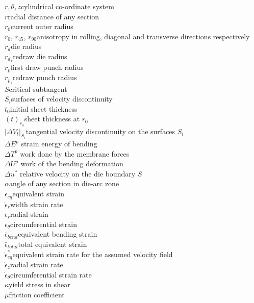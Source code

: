\begin{tabbing}
             \>$r,\theta,z$\>\>\>\>\>cylindrical co-ordinate system \\
             \>$r$\>\>\>\>\>radial distance of any section\\
             \>$r_0$\>\>\>\>\>current outer radius\\
             \>$r_0$, $r_{45}$, $r_{90}$\>\>\>\>\>anisotropy in rolling, diagonal and transverse directions respectively\\
             \>$r_d$\>\>\>\>\>die radius\\
             \>$r_{d_1}$\>\>\>\>\>redraw die radius\\
             \>$r_p$\>\>\>\>\>first draw punch radius \\
             \>$r_{p_1}$\>\>\>\>\>redraw punch radius\\
             \>$S$\>\>\>\>\>critical subtangent \\
             \>$S_i$\>\>\>\>\>surfaces of velocity discontinuity \\
             \>$t_0$\>\>\>\>\>initial sheet thickness\\
             \>$(t)_{r_0}$\>\>\>\>\>sheet thickness at $r_0$ \\
             \>$\vert{\Delta V_t}\vert_{S_i}$\>\>\>\>\>tangential velocity discontinuity on the surfaces $S_i$ \\
             \>$\Delta E^p$ \>\>\>\>\>strain energy of bending \\
             \>$\Delta T^p$ \>\>\>\>\>work done by the membrane forces \\
             \>$\Delta U^p$ \>\>\>\>\>work of the bending deformation\\
             \>$\Delta u^{*}$ \>\>\>\>\>relative velocity on the die boundary $S$\\

             \>$\alpha$\>\>\>\>\>angle of any section in die-arc zone\\
             \>$\epsilon_{eq}$\>\>\>\>\>equivalent strain\\
             \>$\dot{\epsilon}_{r}$\>\>\>\>\>width strain rate\\
             \>$\epsilon_r$\>\>\>\>\>radial strain\\
             \>$\epsilon_{\theta}$\>\>\>\>\>circumferential strain \\
             \>$\bar\epsilon_{bend}$\>\>\>\>\>equivalent bending strain\\
             \>$\bar\epsilon_{total}$\>\>\>\>\>total equivalent strain\\
             \>$\dot{\epsilon}^{*}_{eq}$\>\>\>\>\>equivalent strain rate for the assumed velocity field\\
             \>$\dot{\epsilon}_{z}$\>\>\>\>\>radial strain rate\\
             \>$\dot{\epsilon}_{\theta}$\>\>\>\>\>circumferential strain rate\\
             \>$\kappa$\>\>\>\>\>yield stress in shear \\
             \>$\mu$\>\>\>\>\>friction coefficient \\


\end{tabbing}
